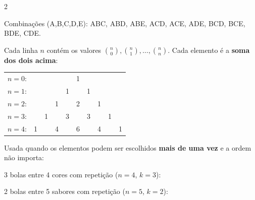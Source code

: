 \documentclass[12pt]{article}
\begin{document}
\begin{multicols}{2}


Combinações (A,B,C,D,E): ABC, ABD, ABE, ACD, ACE, ADE, BCD, BCE, BDE, CDE.


Cada linha $n$ contém os valores $\binom{n}{0}, \binom{n}{1}, \ldots, \binom{n}{n}$.
Cada elemento é a \textbf{soma dos dois acima}:

\begin{center}
\begin{tabular}{rccccccccc}
$n=0$: & & & & & 1 & & & & \\
$n=1$: & & & & 1 & & 1 & & & \\
$n=2$: & & & 1 & & 2 & & 1 & & \\
$n=3$: & & 1 & & 3 & & 3 & & 1 & \\
$n=4$: & 1 & & 4 & & 6 & & 4 & & 1 \\
\end{tabular}
\end{center}



Usada quando os elementos podem ser escolhidos \textbf{mais de uma vez}
e a ordem não importa:



3 bolas entre 4 cores com repetição ($n=4$, $k=3$):



2 bolas entre 5 sabores com repetição ($n=5$, $k=2$):





\end{multicols}
\end{document}
